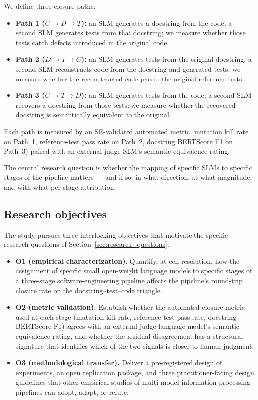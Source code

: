 We define three closure paths:
\begin{itemize}
  \item \textbf{Path 1 (}$C \to D \to T$\textbf{):} an SLM generates a docstring from the code; a second SLM generates tests from that docstring; we measure whether those tests catch defects introduced in the original code.
  \item \textbf{Path 2 (}$D \to T \to C$\textbf{):} an SLM generates tests from the original docstring; a second SLM reconstructs code from the docstring and generated tests; we measure whether the reconstructed code passes the original reference tests.
  \item \textbf{Path 3 (}$C \to T \to D$\textbf{):} an SLM generates tests from the code; a second SLM recovers a docstring from those tests; we measure whether the recovered docstring is semantically equivalent to the original.
\end{itemize}

Each path is measured by an SE-validated automated metric (mutation kill rate on Path~1, reference-test pass rate on Path~2, docstring BERTScore F1 on Path~3) paired with an external judge SLM's semantic-equivalence rating.

The central research question is whether the mapping of specific SLMs to specific stages of the pipeline matters --- and if so, in what direction, at what magnitude, and with what per-stage attribution.

\subsection{Research objectives}
\label{sec:research_objectives}

The study pursues three interlocking objectives that motivate the specific research questions of Section~\ref{sec:research_questions}.

\begin{itemize}
  \item \textbf{O1 (empirical characterization).} Quantify, at cell resolution, how the assignment of specific small open-weight language models to specific stages of a three-stage software-engineering pipeline affects the pipeline's round-trip closure rate on the docstring--test--code triangle.
  \item \textbf{O2 (metric validation).} Establish whether the automated closure metric used at each stage (mutation kill rate, reference-test pass rate, docstring BERTScore F1) agrees with an external judge language model's semantic-equivalence rating, and whether the residual disagreement has a structural signature that identifies which of the two signals is closer to human judgment.
  \item \textbf{O3 (methodological transfer).} Deliver a pre-registered design of experiments, an open replication package, and three practitioner-facing design guidelines that other empirical studies of multi-model information-processing pipelines can adopt, adapt, or refute.
\end{itemize}


